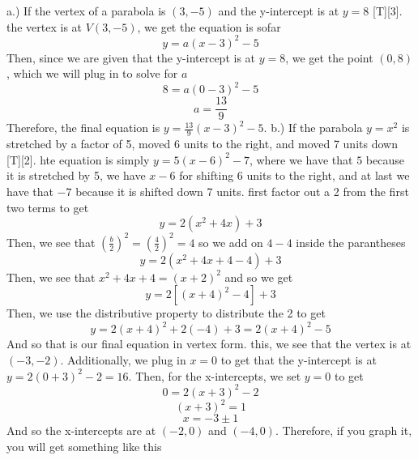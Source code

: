 \documentclass{article}
\begin{document}
a.) If the vertex of a parabola is $(3,-5)$ and the y-intercept is at $y=8$ [T][3].
\vskip 0.5cm
\textbf{\color{red}{Since}} the vertex is at $V(3,-5)$, we get the equation is sofar
\[
y=a(x-3)^2-5
\]
Then, since we are given that the y-intercept is at $y=8$, we get the point $(0,8)$, which we will plug in to solve for $a$
\[
	8=a(0-3)^2-5
\]
\[
	a=\frac{13}{9}
\]
Therefore, the final equation is $y=\frac{13}{9}(x-3)^2-5$.
\vskip 1cm
b.) If the parabola $y=x^2$ is stretched by a factor of 5, moved 6 units to the right, and moved 7 units down [T][2]. 
\vskip 0.5cm
hte equation is simply $y=5(x-6)^2-7$, where we have that $5$ because it is stretched by 5, we have $x-6$ for shifting 6 units to the right, and at last we have that $-7$ because it is shifted down 7 units. 
\vskip 1cm
\vskip 0.5cm
\textbf{\color{red}{We}} first factor out a 2 from the first two terms to get 
\[
	y=2(x^2+4x)+3
\]
Then, we see that $(\frac{b}{2})^2=(\frac{4}{2})^2=4$ so we add on $4-4$ inside the parantheses
\[
	y=2(x^2+4x+4-4)+3
\]
Then, we see that $x^2+4x+4=(x+2)^2$ and so we get 
\[
	y=2[(x+4)^2-4]+3
\]
Then, we use the distributive property to distribute the 2 to get 
\[
	y=2(x+4)^2+2(-4)+3=2(x+4)^2-5
\]
And so that is our final equation in vertex form.
\vskip 1cm
\vskip 0.5cm
\textbf{\color{red}{From}} this, we see that the vertex is at $(-3,-2)$. Additionally, we plug in $x=0$ to get that the y-intercept is at $y=2(0+3)^2-2=16$. Then, for the x-intercepts, we set $y=0$ to get 
\[
	0=2(x+3)^2-2
\]
\[
	(x+3)^2=1
\]
\[
	x=-3\pm1
\]
And so the x-intercepts are at $(-2,0)$ and $(-4,0)$. Therefore, if you graph it, you will get something like this
\end{document}
